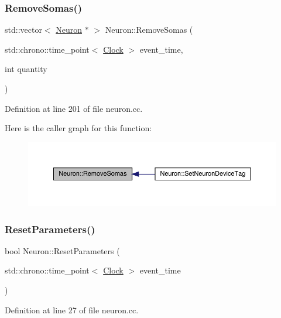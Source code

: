 \subsubsection{\texorpdfstring{Remove\+Somas()}{RemoveSomas()}}
{\footnotesize\ttfamily std\+::vector$<$ \hyperlink{class_neuron}{Neuron} $\ast$ $>$ Neuron\+::\+Remove\+Somas (\begin{DoxyParamCaption}\item[{std\+::chrono\+::time\+\_\+point$<$ \hyperlink{universe_8h_a0ef8d951d1ca5ab3cfaf7ab4c7a6fd80}{Clock} $>$}]{event\+\_\+time,  }\item[{int}]{quantity }\end{DoxyParamCaption})}



Definition at line 201 of file neuron.\+cc.

Here is the caller graph for this function\+:
\nopagebreak
\begin{figure}[H]
\begin{center}
\leavevmode
\includegraphics[width=350pt]{class_neuron_a976b1bab63d0bd21b1c8c8e1cfbd17fe_icgraph}
\end{center}
\end{figure}
\mbox{\label{class_neuron_a4c154fecb0b689d7da9d8d274f067ccf}} 
\subsubsection{\texorpdfstring{Reset\+Parameters()}{ResetParameters()}}
{\footnotesize\ttfamily bool Neuron\+::\+Reset\+Parameters (\begin{DoxyParamCaption}\item[{std\+::chrono\+::time\+\_\+point$<$ \hyperlink{universe_8h_a0ef8d951d1ca5ab3cfaf7ab4c7a6fd80}{Clock} $>$}]{event\+\_\+time }\end{DoxyParamCaption})}



Definition at line 27 of file neuron.\+cc.

